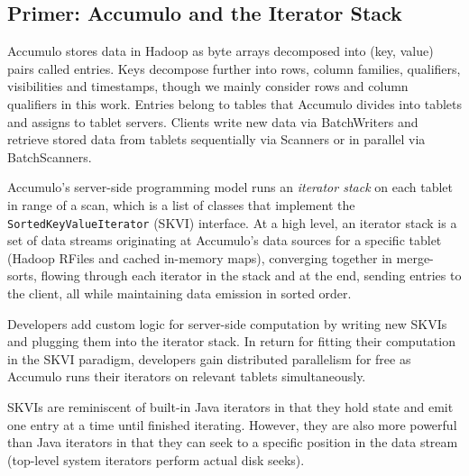 





\subsection{Primer: Accumulo and the Iterator Stack}
\label{sAccumuloIterators}
Accumulo stores data in Hadoop as byte arrays decomposed into (key, value) pairs called entries.
Keys decompose further into rows, column families, qualifiers, visibilities and timestamps,
though we mainly consider rows and column qualifiers in this work.
Entries belong to tables that Accumulo divides into tablets and assigns to tablet servers.
Clients write new data via BatchWriters and retrieve stored data from tablets sequentially via Scanners
or in parallel via BatchScanners.

Accumulo's server-side programming model runs an \emph{iterator stack} on each tablet in range of a scan, 
which is a list of classes that implement the \texttt{SortedKeyValueIterator} (SKVI) interface.
At a high level, an iterator stack is a set of data streams originating
at Accumulo's data sources for a specific tablet (Hadoop RFiles and cached in-memory maps), 
converging together in merge-sorts,
flowing through each iterator in the stack and at the end, sending entries to the client,
all while maintaining data emission in sorted order.

Developers add custom logic for server-side computation
by writing new SKVIs and plugging them into the iterator stack.
In return for fitting their computation in the SKVI paradigm, developers gain
distributed parallelism for free as Accumulo runs their iterators on relevant tablets simultaneously.


SKVIs are reminiscent of built-in Java iterators in that they hold state 
and emit one entry at a time until finished iterating.
However, they are also more powerful than Java iterators in that they can seek to a specific position
in the data stream (top-level system iterators perform actual disk seeks).

